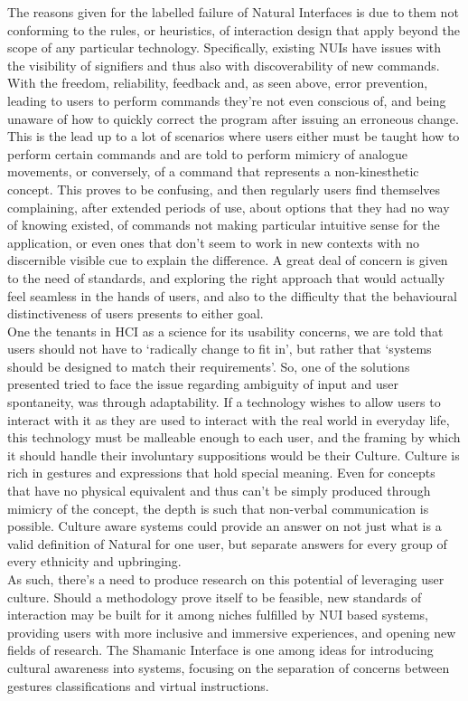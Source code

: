     The reasons given for the labelled failure of Natural Interfaces is due to them not conforming to the rules, or heuristics, of interaction design that apply beyond the scope of any particular technology\cite{Shneiderman:1997}\cite{Nielsen:1990}. Specifically, existing NUIs have issues with the visibility of signifiers and thus also with discoverability of new commands. With the freedom, reliability, feedback and, as seen above, error prevention, leading to users to perform commands they’re not even conscious of, and being unaware of how to quickly correct the program after issuing an erroneous change\cite{NormanGIS}\cite{malizia2012}. This is the lead up to a lot of scenarios where users either must be taught how to perform certain commands and are told to perform mimicry of analogue movements, or conversely, of a command that represents a non-kinesthetic concept. This proves to be confusing, and then regularly users find themselves complaining, after extended periods of use, about options that they had no way of knowing existed, of commands not making particular intuitive sense for the application, or even ones that don’t seem to work in new contexts with no discernible visible cue to explain the difference. A great deal of concern is given to the need of standards, and exploring the right approach that would actually feel seamless in the hands of users, and also to the difficulty that the behavioural distinctiveness of users presents to either goal.\\
    One the tenants in HCI as a science for its usability concerns, we are told that users should not have to ‘radically change to fit in’, but rather that ‘systems should be designed to match their requirements’\cite{Preece1993}. So, one of the solutions presented tried to face the issue regarding ambiguity of input and user spontaneity, was through adaptability. If a technology wishes to allow users to interact with it as they are used to interact with the real world in everyday life, this technology must be malleable enough to each user, and the framing by which it should handle their involuntary suppositions would be their Culture. Culture is rich in gestures and expressions that hold special meaning. Even for concepts that have no physical equivalent and thus can’t be simply produced through mimicry of the concept, the depth is such that non-verbal communication is possible. Culture aware systems could provide an answer on not just what is a valid definition of Natural for one user, but separate answers for every group of every ethnicity and upbringing.\\
    As such, there’s a need to produce research on this potential of leveraging user culture. Should a methodology prove itself to be feasible, new standards of interaction may be built for it among niches fulfilled by NUI based systems, providing users with more inclusive and immersive experiences, and opening new fields of research. The Shamanic Interface is one among ideas for introducing cultural awareness into systems, focusing on the separation of concerns between gestures classifications and virtual instructions.

